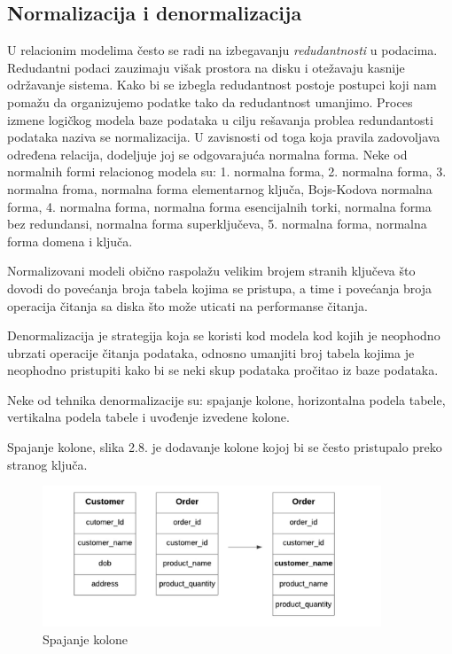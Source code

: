 \documentclass[12pt,oneside]{memoir}
\begin{document}
\subsection{Normalizacija i denormalizacija}

U relacionim modelima često se radi na izbegavanju \textit{redudantnosti} u podacima. Redudantni podaci zauzimaju višak prostora na disku i otežavaju kasnije održavanje sistema. Kako bi se izbegla redudantnost postoje postupci koji nam pomažu da organizujemo podatke tako da redudantnost umanjimo. Proces izmene logičkog modela baze podataka u cilju rešavanja problea redundantosti podataka naziva se normalizacija. U zavisnosti od toga koja pravila zadovoljava određena relacija, dodeljuje joj se odgovarajuća normalna forma. Neke od normalnih formi relacionog modela su: 1. normalna forma, 2. normalna forma, 3. normalna froma, normalna forma elementarnog ključa, Bojs-Kodova normalna forma, 4. normalna forma, normalna forma esencijalnih torki, normalna forma bez redundansi, normalna forma superključeva, 5. normalna forma, normalna forma domena i ključa.

Normalizovani modeli obično raspolažu velikim brojem stranih ključeva što dovodi do povećanja broja tabela kojima se pristupa, a time i povećanja broja operacija čitanja sa diska što može uticati na performanse čitanja.

Denormalizacija je strategija koja se koristi kod modela kod kojih je neophodno ubrzati operacije čitanja podataka, odnosno umanjiti broj tabela kojima je neophodno pristupiti kako bi se neki skup podataka pročitao iz baze podataka.  

Neke od tehnika denormalizacije su:  spajanje kolone, horizontalna podela tabele, vertikalna podela tabele i uvođenje izvedene kolone. 

Spajanje kolone, slika 2.8. je dodavanje kolone kojoj bi se često pristupalo preko stranog ključa.

\begin{figure}[!ht]
  \centering
  \includegraphics[width=0.9\textwidth]{denormalizacija.png}
  \caption{Spajanje kolone}
  \label{fig:grafikon}
\end{figure}
\end{document}
